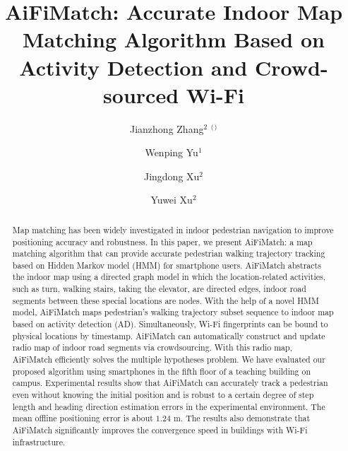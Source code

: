 \documentclass{llncs}
\begin{document}
%
\title{AiFiMatch: Accurate Indoor Map Matching Algorithm Based on Activity Detection and Crowd-sourced Wi-Fi}
%

\author{Jianzhong Zhang$^2$ $^($\Envelope$^)$ \and Wenping Yu$^1$ \and Jingdong Xu$^2$ \and Yuwei Xu$^2$}
%
%
%


\maketitle              %

\begin{abstract}

Map matching has been widely investigated in indoor pedestrian navigation to improve positioning accuracy and robustness. In this paper, we present AiFiMatch: a map matching algorithm that can provide accurate pedestrian walking trajectory tracking based on Hidden Markov model (HMM) for smartphone users. AiFiMatch abstracts the indoor map using a directed graph model in which the location-related activities, such as turn, walking stairs, taking the elevator, are directed edges, indoor road segments between these special locations are nodes. With the help of a novel HMM model, AiFiMatch maps pedestrian's walking trajectory subset sequence to indoor map based on activity detection (AD). Simultaneously, Wi-Fi fingerprints can be bound to physical locations by timestamp. AiFiMatch can automatically construct and update radio map of indoor road segments via crowdsourcing. With this radio map, AiFiMatch  efficiently solves the multiple hypotheses problem. We have evaluated our proposed algorithm using smartphones in the fifth floor of a teaching building on campus. Experimental results show that AiFiMatch can accurately track a pedestrian even without knowing the initial position and is robust to a certain degree of step length and heading direction estimation errors in the experimental environment. The mean offline positioning error is about $1.24$ m. The results also demonstrate that AiFiMatch significantly improves the convergence speed in buildings with Wi-Fi infrastructure.

\end{abstract}
%
\end{document}
